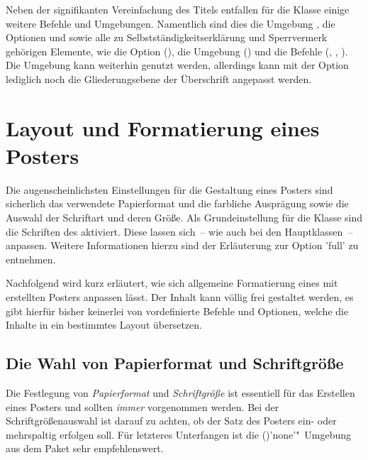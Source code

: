 \begin{Bundle*}[v2.05]{}
Neben der signifikanten Vereinfachung des Titels entfallen für die Klasse 
 einige weitere Befehle und Umgebungen. Namentlich sind 
dies die Umgebung , die Optionen  
und  sowie alle zu Selbstständigkeitserklärung und 
Sperrvermerk gehörigen Elemente, wie die Option (), die 
Umgebung () und die Befehle (, 
, ). Die Umgebung  
kann weiterhin genutzt werden, allerdings kann mit der Option  
lediglich noch die Gliederungsebene der Überschrift angepasst werden.

\section{Layout und Formatierung eines Posters}
%
Die augenscheinlichsten Einstellungen für die Gestaltung eines Posters sind 
sicherlich das verwendete Papierformat und die farbliche Ausprägung sowie die 
Auswahl der Schriftart und deren Größe. Als Grundeinstellung für die Klasse
 sind die Schriften des \TUDCDs aktiviert. Diese lassen 
sich~-- wie auch bei den Hauptklassen~-- anpassen. Weitere Informationen hierzu 
sind der Erläuterung zur Option 'full' zu entnehmen.

Nachfolgend wird kurz erläutert, wie sich allgemeine Formatierung eines mit 
 erstellten Posters anpassen lässt. Der Inhalt kann völlig 
frei gestaltet werden, es gibt hierfür bisher keinerlei von \TUDScript 
vordefinierte Befehle und Optionen, welche die Inhalte in ein bestimmtes Layout 
übersetzen.
 


\subsection{Die Wahl von Papierformat und Schriftgröße}
%
%
%

Die Festlegung von \emph{Papierformat} und \emph{Schriftgröße} ist essentiell 
für das Erstellen eines Posters und sollten \emph{immer} vorgenommen werden. 
Bei der Schriftgrößenauswahl ist darauf zu achten, ob der Satz des Posters 
ein- oder mehrspaltig erfolgen soll. Für letzteres Unterfangen ist die 
()'none'"~Umgebung aus dem Paket 
 sehr empfehlenswert. 


\end{Bundle*}
